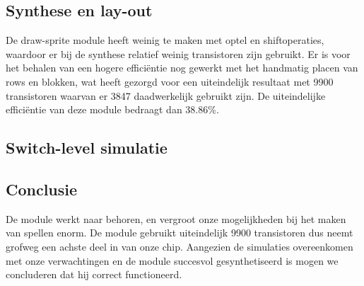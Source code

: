 \documentclass{scrartcl} %
\begin{document}
\subsection{Synthese en lay-out}
De draw-sprite module heeft weinig te maken met optel en shiftoperaties, waardoor er bij de synthese relatief weinig transistoren zijn gebruikt. Er is voor het behalen van een hogere efficiëntie nog gewerkt met het handmatig placen van rows en blokken, wat heeft gezorgd voor een uiteindelijk resultaat met 9900 transistoren waarvan er 3847 daadwerkelijk gebruikt zijn. De uiteindelijke efficiëntie van deze module bedraagt dan 38.86\%.

\subsection{Switch-level simulatie}


\subsection{Conclusie}
De module werkt naar behoren, en vergroot onze mogelijkheden bij het maken van spellen enorm. De module gebruikt uiteindelijk 9900 transistoren dus neemt grofweg een achste deel in van onze chip. Aangezien de simulaties overeenkomen met onze verwachtingen en de module succesvol gesynthetiseerd is mogen we concluderen dat hij correct functioneerd.
\end{document}
